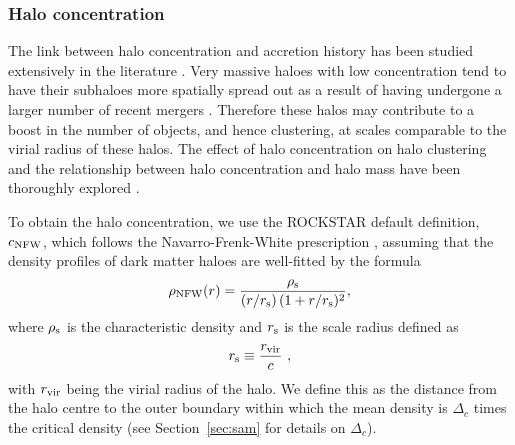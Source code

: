 \documentclass[fleqn,usenatbib]{mnras}
\newcommand{\rss}[1]{\textcolor{purple}{(rss: #1)}}
\begin{document}
\subsubsection{Halo concentration}
The link between halo concentration and accretion history has been studied extensively in the literature \citep{1997ApJ...490..493N,Wechsler:2001cs,2014MNRAS.441..378L,2016MNRAS.460.1214L}. Very massive haloes with low concentration tend to have their subhaloes more spatially spread out as a result of having undergone a larger number of recent mergers \citep{sownak}. 
Therefore these halos may contribute to a boost in the number of objects, and hence clustering, at scales comparable to the virial radius of these halos. 
The effect of halo concentration on halo clustering and the relationship between halo concentration and halo mass have been thoroughly explored
\citep{2001MNRAS.321..559B,2014MNRAS.441..378L,2015ApJ...799..108D,2014MNRAS.441.3359D,2018MNRAS.474.5143M}. 

To obtain the halo concentration, we use the \textsc{ROCKSTAR} default definition, $c_{\rm NFW}$, which follows the Navarro-Frenk-White prescription \citep{1996ApJ...462..563N}, assuming that the density profiles of dark matter haloes are well-fitted by the formula
\begin{equation}    
    \rho_{\rm NFW}(r) = \frac{\rho_{\rm s}}{(r/r_{\rm s})\,(1+r/r_{\rm s})^{2}},
\end{equation}
where $\rho_{\rm s}$ is the characteristic density and $r_{\rm s}$ is the scale radius defined as
\begin{equation}     
    r_{\rm s} \equiv \frac{r_{\rm vir}}{c} \ ,
\end{equation}
with $r_{\rm vir}$ being the virial radius of the halo. We define this as the distance from the halo centre to the outer boundary within which the mean density is $\Delta_c$ times the critical density (see Section~\ref{sec:sam} for details on $\Delta_c$).
\end{document}
